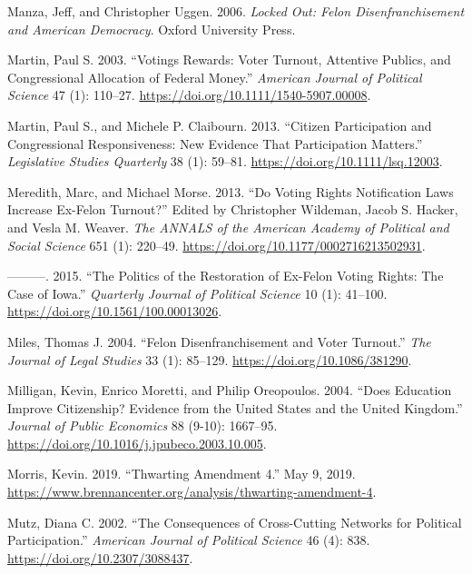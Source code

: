 \documentclass[]{article}
\begin{document}
\leavevmode\hypertarget{ref-locked_out}{}%
Manza, Jeff, and Christopher Uggen. 2006. \emph{Locked Out: Felon Disenfranchisement and American Democracy}. Oxford University Press.

\leavevmode\hypertarget{ref-Martin2003}{}%
Martin, Paul S. 2003. ``Votings Rewards: Voter Turnout, Attentive Publics, and Congressional Allocation of Federal Money.'' \emph{American Journal of Political Science} 47 (1): 110--27. \url{https://doi.org/10.1111/1540-5907.00008}.

\leavevmode\hypertarget{ref-Martin2013}{}%
Martin, Paul S., and Michele P. Claibourn. 2013. ``Citizen Participation and Congressional Responsiveness: New Evidence That Participation Matters.'' \emph{Legislative Studies Quarterly} 38 (1): 59--81. \url{https://doi.org/10.1111/lsq.12003}.

\leavevmode\hypertarget{ref-Meredith2013}{}%
Meredith, Marc, and Michael Morse. 2013. ``Do Voting Rights Notification Laws Increase Ex-Felon Turnout?'' Edited by Christopher Wildeman, Jacob S. Hacker, and Vesla M. Weaver. \emph{The ANNALS of the American Academy of Political and Social Science} 651 (1): 220--49. \url{https://doi.org/10.1177/0002716213502931}.

\leavevmode\hypertarget{ref-Meredith2015}{}%
---------. 2015. ``The Politics of the Restoration of Ex-Felon Voting Rights: The Case of Iowa.'' \emph{Quarterly Journal of Political Science} 10 (1): 41--100. \url{https://doi.org/10.1561/100.00013026}.

\leavevmode\hypertarget{ref-Miles2004}{}%
Miles, Thomas J. 2004. ``Felon Disenfranchisement and Voter Turnout.'' \emph{The Journal of Legal Studies} 33 (1): 85--129. \url{https://doi.org/10.1086/381290}.

\leavevmode\hypertarget{ref-Milligan2004}{}%
Milligan, Kevin, Enrico Moretti, and Philip Oreopoulos. 2004. ``Does Education Improve Citizenship? Evidence from the United States and the United Kingdom.'' \emph{Journal of Public Economics} 88 (9-10): 1667--95. \url{https://doi.org/10.1016/j.jpubeco.2003.10.005}.

\leavevmode\hypertarget{ref-Morris2019}{}%
Morris, Kevin. 2019. ``Thwarting Amendment 4.'' May 9, 2019. \url{https://www.brennancenter.org/analysis/thwarting-amendment-4}.

\leavevmode\hypertarget{ref-Mutz2002}{}%
Mutz, Diana C. 2002. ``The Consequences of Cross-Cutting Networks for Political Participation.'' \emph{American Journal of Political Science} 46 (4): 838. \url{https://doi.org/10.2307/3088437}.
\end{document}
